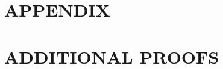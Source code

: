 \documentclass[12pt,reqno,oneside]{pucthesis}
\begin{document}




{\setlength{\baselineskip}{0.8\baselineskip}

\par}


\newif\ifappendix
\appendixtrue
\ifappendix
\appendix
\clearpage
\begingroup%
\makeatletter%
\let\clearpage\relax%
\vspace*{\fill}%
\vspace*{\dimexpr-50\p@-\baselineskip}%
\chapter*{APPENDIX}
\vspace*{\fill}%
\endgroup

\chapter{ADDITIONAL PROOFS}


\fi




\end{document}
